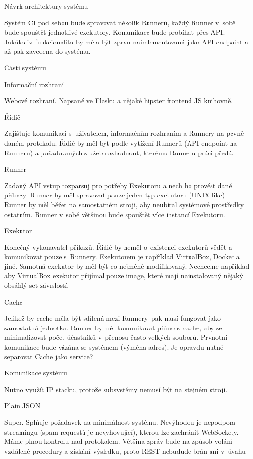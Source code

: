 \chap Návrh architektury systému

Systém CI pod sebou bude spravovat několik Runnerů, každý Runner v~sobě bude spouštět jednotlivé exekutory.
Komunikace bude probíhat přes API.
Jakákoliv funkcionalita by měla být zprvu naimlementovaná jako API endpoint a až pak zavedena do systému.

\sec Části systému

\secc Informační rozhraní

Webové rozhraní. Napsané ve Flasku a nějaké hipster frontend JS knihovně.

\secc Řidič

Zajišťuje komunikaci s~uživatelem, informačním rozhraním a Runnery na pevně daném protokolu.
Řidič by měl být podle vytížení Runnerů (API endpoint na Runneru) a požadovaných služeb rozhodnout, kterému Runneru práci předá.

\secc Runner

Zadaný API vstup rozparsuj pro potřeby Exekutoru a nech ho provést dané příkazy.
Runner by měl spravovat pouze jeden typ exekutoru (UNIX like).
Runner by měl běžet na samostatném stroji, aby neubíral systémové prostředky ostatním.
Runner v~sobě většinou bude spouštět více instancí Exekutoru.

\seccc Exekutor

Konečný vykonavatel příkazů. Řidič by neměl o~existenci exekutorů vědět a komunikovat pouze s~Runnery.
Exekutorem je například VirtualBox, Docker a jiné.
Samotná exekutor by měl být co nejméně modifikovaný.
Nechceme například aby VirtualBox exekutor přijímal pouze image, které mají nainstalovaný nějaký obsáhlý set závislostí.

\secc Cache

Jelikož by cache měla být sdílená mezi Runnery, pak musí fungovat jako samostatná jednotka.
Runner by měl komunikovat přímo s~cache, aby se minimalizovat počet účastníků v~přenosu často velkých souborů.
Prvnotní komunikace bude vázána se systémem (výměna adres).
Je opravdu nutné separovat Cache jako service?

\sec Komunikace systému

Nutno využít IP stacku, protože subsystémy nemusí být na stejném stroji.

\secc Plain JSON

Super. Splňuje požadavek na minimálnost systému.
Nevýhodou je nepodpora streamingu (spam requestů je nevyhovující), kterou lze zachránit WebSockety.
Máme plnou kontrolu nad protokolem.
Většina zpráv bude na způsob volání vzdálené procedury a získání výsledku, proto REST nebudude brán ani v~úvahu


